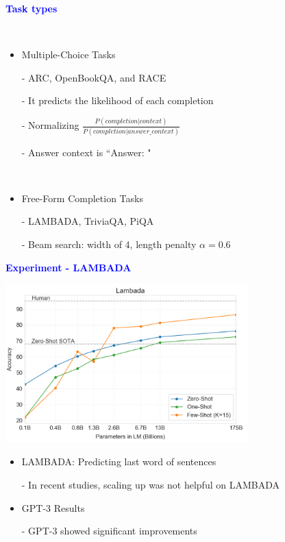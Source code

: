 \documentclass[professionalfont]{beamer}
\begin{document}
\begin{frame}
\begin{center}
    { \textbf{\textcolor{blue}{ {\fontsize{12}{14}\selectfont Task types} }} }
\end{center}
\\[0.3cm]

{\fontsize{10}{14}\selectfont 
\begin{itemize}
    \item Multiple-Choice Tasks

    - ARC, OpenBookQA, and RACE

    - It predicts the likelihood of each completion

    - Normalizing \( \frac{P(completion|context)}{P(completion|answer\_context)} \)

    - Answer context is ``Answer: "

    \\[0.2cm]

    \item Free-Form Completion Tasks

    - LAMBADA, TriviaQA, PiQA

    - Beam search: width of 4, length penalty \( \alpha = 0.6 \)

\end{itemize}
}

\end{frame}

\begin{frame}
\begin{center}
    { \textbf{\textcolor{blue}{ {\fontsize{12}{14}\selectfont Experiment - LAMBADA} }} }
\end{center}

\begin{center}
    \includegraphics[width=0.7\textwidth]{figure/3-2.png}
\end{center}

{\fontsize{10}{14}\selectfont 
\begin{itemize}
    \item LAMBADA: Predicting last word of sentences

    - In recent studies, scaling up was not helpful on LAMBADA

    \item GPT-3 Results
    
    - GPT-3 showed significant improvements

\end{itemize}
}

\end{frame}
\end{document}

